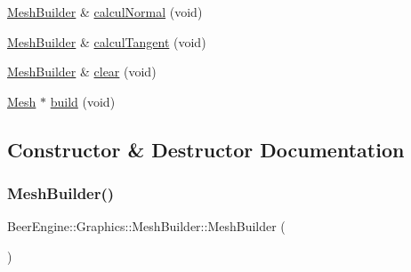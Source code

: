 \begin{DoxyCompactItemize}
\mbox{\hyperlink{class_beer_engine_1_1_graphics_1_1_mesh_builder}{Mesh\+Builder}} \& \mbox{\hyperlink{class_beer_engine_1_1_graphics_1_1_mesh_builder_a65981a84e64924a36bc208614844e34b}{calcul\+Normal}} (void)
\item 
\mbox{\hyperlink{class_beer_engine_1_1_graphics_1_1_mesh_builder}{Mesh\+Builder}} \& \mbox{\hyperlink{class_beer_engine_1_1_graphics_1_1_mesh_builder_a433beadaa7c9ed25dc913e40a99da421}{calcul\+Tangent}} (void)
\item 
\mbox{\hyperlink{class_beer_engine_1_1_graphics_1_1_mesh_builder}{Mesh\+Builder}} \& \mbox{\hyperlink{class_beer_engine_1_1_graphics_1_1_mesh_builder_abeb4d8dbeb9096e1fa2c746856356709}{clear}} (void)
\item 
\mbox{\hyperlink{class_beer_engine_1_1_graphics_1_1_mesh}{Mesh}} $\ast$ \mbox{\hyperlink{class_beer_engine_1_1_graphics_1_1_mesh_builder_a0a5704934acb9b6b2f5ffbdd01ae4c8b}{build}} (void)
\end{DoxyCompactItemize}


\subsection{Constructor \& Destructor Documentation}
\mbox{\label{class_beer_engine_1_1_graphics_1_1_mesh_builder_a37188d6e052302a6492e8c32499ebcac}} 
\subsubsection{\texorpdfstring{Mesh\+Builder()}{MeshBuilder()}}
{\footnotesize\ttfamily Beer\+Engine\+::\+Graphics\+::\+Mesh\+Builder\+::\+Mesh\+Builder (\begin{DoxyParamCaption}{ }\end{DoxyParamCaption})}

\mbox{\label{class_beer_engine_1_1_graphics_1_1_mesh_builder_aa83ee10b505b83585ef5a6d4d21ff65b}} 
